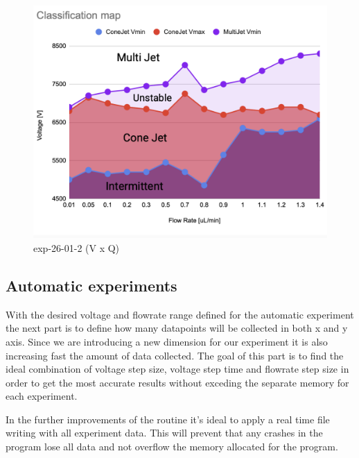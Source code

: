 \begin{figure}[H]
    \center
    \includegraphics[width=12cm]{Figuras/regions.png}
    \caption{ exp-26-01-2 (V x Q)}
\end{figure}


    \subsection{Automatic experiments}

        With the desired voltage and flowrate range defined for the automatic experiment the next part is to define how many datapoints will be collected in both
        x and y axis. Since we are introducing a new dimension for our experiment it is also increasing fast the amount of data collected.
        The goal of this part is to find the ideal combination of voltage step size, voltage step time and flowrate step size in order to get the most accurate results without exceding the separate memory for each experiment.

        In the further improvements of the routine it's ideal to apply a real time file writing with all experiment data.
        This will prevent that any crashes in the program lose all data and not overflow the memory allocated for the program.


